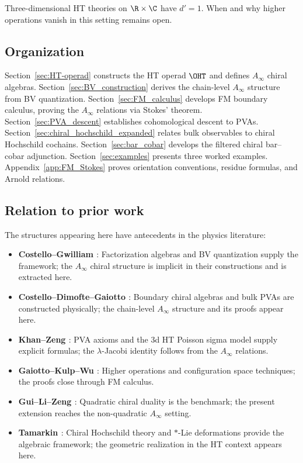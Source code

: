 Three-dimensional HT theories on $\R \times \C$ have $d'=1$. When and why higher operations vanish in this setting remains open.

\subsection{Organization}

Section~\ref{sec:HT-operad} constructs the HT operad $\OHT$ and defines $A_\infty$ chiral algebras.
Section~\ref{sec:BV_construction} derives the chain-level $A_\infty$ structure from BV quantization.
Section~\ref{sec:FM_calculus} develops FM boundary calculus, proving the $A_\infty$ relations via Stokes' theorem.
Section~\ref{sec:PVA_descent} establishes cohomological descent to PVAs.
Section~\ref{sec:chiral_hochschild_expanded} relates bulk observables to chiral Hochschild cochains.
Section~\ref{sec:bar_cobar} develops the filtered chiral bar--cobar adjunction.
Section~\ref{sec:examples} presents three worked examples.
Appendix~\ref{app:FM_Stokes} proves orientation conventions, residue formulas, and Arnold relations.

\subsection{Relation to prior work}

The structures appearing here have antecedents in the physics literature:

\begin{itemize}
\item \textbf{Costello--Gwilliam \cite{CG17}}: Factorization algebras and BV quantization supply the framework; the $A_\infty$ chiral structure is implicit in their constructions and is extracted here.

\item \textbf{Costello--Dimofte--Gaiotto \cite{CDG20}}: Boundary chiral algebras and bulk PVAs are constructed physically; the chain-level $A_\infty$ structure and its proofs appear here.

\item \textbf{Khan--Zeng \cite{KZ25}}: PVA axioms and the 3d HT Poisson sigma model supply explicit formulas; the $\lambda$-Jacobi identity follows from the $A_\infty$ relations.

\item \textbf{Gaiotto--Kulp--Wu \cite{GKW25}}: Higher operations and configuration space techniques; the proofs close through FM calculus.

\item \textbf{Gui--Li--Zeng \cite{GLZ22}}: Quadratic chiral duality is the benchmark; the present extension reaches the non-quadratic $A_\infty$ setting.

\item \textbf{Tamarkin \cite{Tam02}}: Chiral Hochschild theory and $*$-Lie deformations provide the algebraic framework; the geometric realization in the HT context appears here.
\end{itemize}

